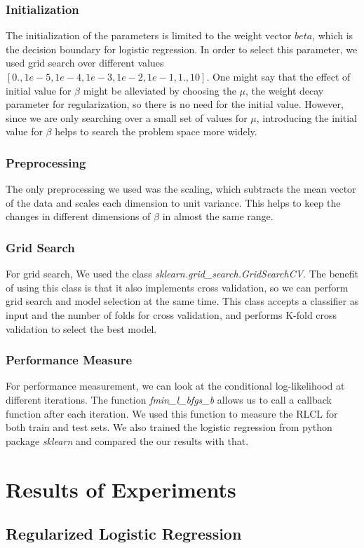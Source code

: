 \documentclass[twoside,12pt]{article}
\begin{document}
\subsubsection{Initialization}
The initialization of the parameters is limited to the weight vector $beta$, which is the decision boundary for logistic regression. In order to select this parameter, we used grid search over different values $[0.,1e-5,1e-4,1e-3,1e-2,1e-1,1.,10]$. One might say that the effect of initial value for $\beta$ might be alleviated by choosing the $\mu$, the weight decay parameter for regularization, so there is no need for the initial value. However, since we are only searching over a small  set of values for $\mu$, introducing the initial value for $\beta$ helps to search the problem space more widely.
\subsubsection{Preprocessing}
The only preprocessing we used was the scaling, which subtracts the mean vector of the data and scales each dimension to unit variance. This helps to keep the changes in different dimensions of $\beta$ in almost the same range.
\subsubsection{Grid Search}
For grid search, We used the class {\it sklearn.grid\_search.GridSearchCV}. The benefit of using this class is that it also implements cross validation, so we can perform grid search and model selection at the same time. This class accepts a classifier as input and the number of folds for cross validation, and performs K-fold cross validation to select the best model.
\subsubsection{Performance Measure}
For performance measurement, we can look at the conditional log-likelihood at different iterations. The function {\it fmin\_l\_bfgs\_b} allows us to call a callback function after each iteration. We used this function to measure the RLCL for both train and test sets. We also trained the logistic regression from python package {\it sklearn} and compared the our results with that.
\section{Results of Experiments}
\subsection{Regularized Logistic Regression}
\end{document}
